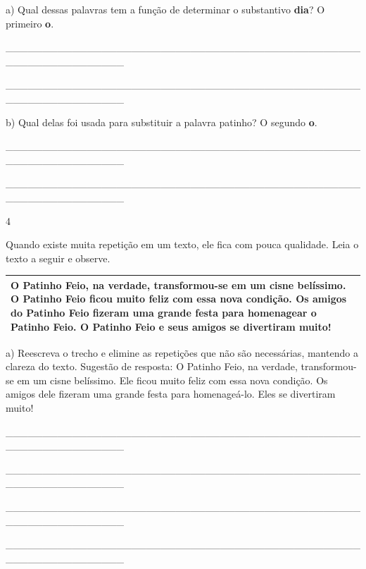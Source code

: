 \begin{itemize}
{{{\begin{itemize}
\begin{itemize}
\begin{itemize}
a) Qual dessas palavras tem a função de determinar o substantivo
\textbf{dia}? O primeiro \textbf{o}.

\_\_\_\_\_\_\_\_\_\_\_\_\_\_\_\_\_\_\_\_\_\_\_\_\_\_\_\_\_\_\_\_\_\_\_\_\_\_\_\_\_\_\_\_\_\_\_\_\_\_\_\_\_\_\_\_\_\_\_\_\_\_\_\_

\_\_\_\_\_\_\_\_\_\_\_\_\_\_\_\_\_\_\_\_\_\_\_\_\_\_\_\_\_\_\_\_\_\_\_\_\_\_\_\_\_\_\_\_\_\_\_\_\_\_\_\_\_\_\_\_\_\_\_\_\_\_\_\_

b) Qual delas foi usada para substituir a palavra patinho? O segundo
\textbf{o}.

\_\_\_\_\_\_\_\_\_\_\_\_\_\_\_\_\_\_\_\_\_\_\_\_\_\_\_\_\_\_\_\_\_\_\_\_\_\_\_\_\_\_\_\_\_\_\_\_\_\_\_\_\_\_\_\_\_\_\_\_\_\_\_\_

\_\_\_\_\_\_\_\_\_\_\_\_\_\_\_\_\_\_\_\_\_\_\_\_\_\_\_\_\_\_\_\_\_\_\_\_\_\_\_\_\_\_\_\_\_\_\_\_\_\_\_\_\_\_\_\_\_\_\_\_\_\_\_\_

\num{4}

Quando existe muita repetição em um texto, ele fica com pouca qualidade.
Leia o texto a seguir e observe.

\begin{longtable}[]{@{}l@{}}
\toprule
O \textbf{Patinho Feio}, na verdade, transformou-se em um cisne
belíssimo. O \textbf{Patinho Feio} ficou muito feliz com essa nova
condição. Os amigos do \textbf{Patinho Feio} fizeram uma grande festa
para homenagear o \textbf{Patinho Feio}. \textbf{O Patinho Feio e seus
amigos} se divertiram muito!\tabularnewline
\bottomrule
\end{longtable}

a) Reescreva o trecho e elimine as repetições que não são necessárias,
mantendo a clareza do texto. Sugestão de resposta: O Patinho Feio, na
verdade, transformou-se em um cisne belíssimo. Ele ficou muito feliz com
essa nova condição. Os amigos dele fizeram uma grande festa para
homenageá-lo. Eles se divertiram muito!

\_\_\_\_\_\_\_\_\_\_\_\_\_\_\_\_\_\_\_\_\_\_\_\_\_\_\_\_\_\_\_\_\_\_\_\_\_\_\_\_\_\_\_\_\_\_\_\_\_\_\_\_\_\_\_\_\_\_\_\_\_\_\_\_

\_\_\_\_\_\_\_\_\_\_\_\_\_\_\_\_\_\_\_\_\_\_\_\_\_\_\_\_\_\_\_\_\_\_\_\_\_\_\_\_\_\_\_\_\_\_\_\_\_\_\_\_\_\_\_\_\_\_\_\_\_\_\_\_

\_\_\_\_\_\_\_\_\_\_\_\_\_\_\_\_\_\_\_\_\_\_\_\_\_\_\_\_\_\_\_\_\_\_\_\_\_\_\_\_\_\_\_\_\_\_\_\_\_\_\_\_\_\_\_\_\_\_\_\_\_\_\_\_

\_\_\_\_\_\_\_\_\_\_\_\_\_\_\_\_\_\_\_\_\_\_\_\_\_\_\_\_\_\_\_\_\_\_\_\_\_\_\_\_\_\_\_\_\_\_\_\_\_\_\_\_\_\_\_\_\_\_\_\_\_\_\_\_


\end{itemize}
\end{itemize}
\end{itemize}}}}
\end{itemize}
